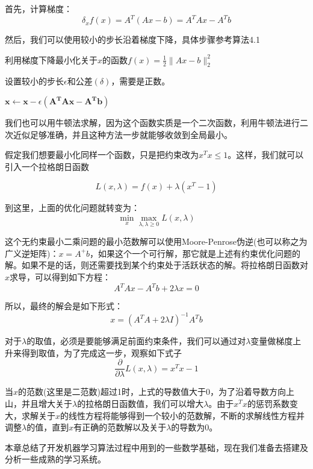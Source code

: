 首先，计算梯度：
\begin{equation}
	\delta_x f(x)=A^T (Ax-b) = A^T Ax - A^Tb
\end{equation}

然后，我们可以使用较小的步长沿着梯度下降，具体步骤参考算法4.1

\begin{algorithm}
	\caption{利用梯度下降最小化关于$x$的函数$f(x)=\frac{1}{2}\lVert Ax-b \rVert_2^2$}
	设置较小的步长$\epsilon$和公差$(\delta)$，需要是正数。
	\begin{algorithmic}
		\STATE $\bm{x \leftarrow {x}} - \epsilon\bm{(A^TAx - A^Tb)}$
		\ENDWHILE		
	\end{algorithmic}
\end{algorithm}


我们也可以用牛顿法求解，因为这个函数实质是一个二次函数，利用牛顿法进行二次近似足够准确，并且这种方法一步就能够收敛到全局最小。



假定我们想要最小化同样一个函数，只是把约束改为$x^T x \leq 1$。这样，我们就可以引入一个拉格朗日函数

\begin{equation}
	L(x, \lambda) = f(x) + \lambda ( x^T - 1 )
\end{equation}

到这里，上面的优化问题就转变为：
\begin{equation}
	\min\limits_{x} \max\limits_{\lambda, \lambda \geq 0} L(x, \lambda)
\end{equation}


这个无约束最小二乘问题的最小范数解可以使用Moore-Penrose伪逆(也可以称之为广义逆矩阵)：$x=A^+b$，如果这个一个可行解，那它就是上述有约束优化问题的解。如果不是的话，则还需要找到某个约束处于活跃状态的解。将拉格朗日函数对$x$求导，可以得到如下方程：
\begin{equation}
	A^TAx - A^Tb + 2\lambda x = 0
\end{equation}

所以，最终的解会是如下形式：
\begin{equation}
	x = (A^TA + 2\lambda I)^{-1}A^Tb
\end{equation}

对于$\lambda$的取值，必须是要能够满足前面约束条件，我们可以通过对$\lambda$变量做梯度上升来得到取值，为了完成这一步，观察如下式子
\begin{equation}
	\frac{\partial}{\partial \lambda}L(x, \lambda) = x^Tx - 1
\end{equation}

当$x$的范数(这里是二范数)超过1时，上式的导数值大于0，为了沿着导数方向上山，并且增大关于$\lambda$的拉格朗日函数值，我们可以增大$\lambda$。由于$x^Tx$的惩罚系数变大，求解关于$x$的线性方程将能够得到一个较小的范数解，不断的求解线性方程并调整$\lambda$的值，直到$x$有正确的范数解以及关于$\lambda$的导数为0。

本章总结了开发机器学习算法过程中用到的一些数学基础，现在我们准备去搭建及分析一些成熟的学习系统。







